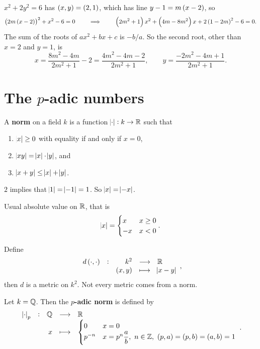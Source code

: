 \begin{example}
$ x^2 + 2y^2 = 6 $ has $ \br{x, y} = \br{2, 1} $, which has line $ y - 1 = m\br{x - 2} $, so
$$ \br{2m\br{x - 2}}^2 + x^2 - 6 = 0 \qquad \implies \qquad \br{2m^2 + 1}x^2 + \br{4m - 8m^2}x + 2\br{1 - 2m}^2 - 6 = 0. $$
The sum of the roots of $ ax^2 + bx + c $ is $ -b / a $. So the second root, other than $ x = 2 $ and $ y = 1 $, is
$$ x = \dfrac{8m^2 - 4m}{2m^2 + 1} - 2 = \dfrac{4m^2 - 4m - 2}{2m^2 + 1}, \qquad y = \dfrac{-2m^2 - 4m + 1}{2m^2 + 1}. $$
\end{example}

\pagebreak

\section{The \texorpdfstring{$ p $}{p}-adic numbers}


\begin{definition}
A \textbf{norm} on a field $ k $ is a function $ \abs{\cdot} : k \to \mathbb{R} $ such that
\begin{enumerate}
\item $ \abs{x} \ge 0 $ with equality if and only if $ x = 0 $,
\item $ \abs{xy} = \abs{x} \cdot \abs{y} $, and
\item $ \abs{x + y} \le \abs{x} + \abs{y} $.
\end{enumerate}
\end{definition}

$ 2 $ implies that $ \abs{1} = \abs{-1} = 1 $. So $ \abs{x} = \abs{-x} $.

\begin{example*}
Usual absolute value on $ \mathbb{R} $, that is
$$ \abs{x} =
\begin{cases}
x & x \ge 0 \\
-x & x < 0 \\
\end{cases}.
$$
\end{example*}

\begin{remark}
Define
$$ \function[d\br{\cdot, \cdot}]{k^2}{\RR}{\br{x, y}}{\abs{x - y}}, $$
then $ d $ is a metric on $ k^2 $. Not every metric comes from a norm.
\end{remark}

\begin{definition}
Let $ k = \mathbb{Q} $. Then the \textbf{$ p $-adic norm} is defined by
$$
\function[\abs{\cdot}_p]{\QQ}{\RR}{x}{
\begin{cases}
0 & x = 0 \\
p^{-n} & x = p^n\dfrac{a}{b}, \ n \in \ZZ, \ \br{p, a} = \br{p, b} = \br{a, b} = 1
\end{cases}
}.
$$
\end{definition}

